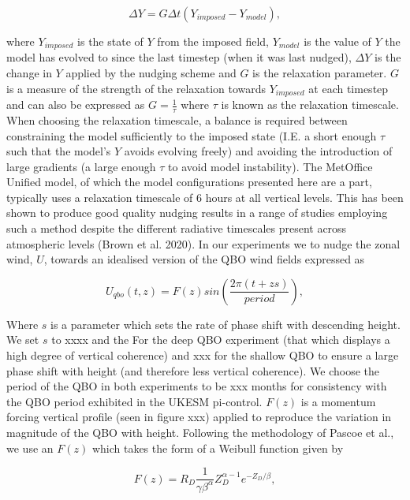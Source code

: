 \begin{equation} \label{eq:nudging}
\Delta Y = G \Delta t (Y_{imposed} - Y_{model}), 
\end{equation}

where $Y_{imposed}$ is the state of $Y$ from the imposed field, $Y_{model}$ is the value of $Y$ the model has evolved to since the last timestep (when it was last nudged), $\Delta Y$ is the change in $Y$ applied by the nudging scheme and $G$ is the relaxation parameter. $G$ is a measure of the strength of the relaxation towards $Y_{imposed}$ at each timestep and can also be expressed as $G = \frac{1}{\tau}$ where $\tau$ is known as the relaxation timescale. When choosing the relaxation timescale, a balance is required between constraining the model sufficiently to the imposed state (I.E. a short enough $\tau$ such that the model's $Y$ avoids evolving freely) and avoiding the introduction of large gradients (a large enough $\tau$ to avoid model instability). The MetOffice Unified model, of which the model configurations presented here are a part, typically uses a relaxation timescale of 6 hours at all vertical levels. This has been shown to produce good quality nudging results in a range of studies employing such a method despite the different radiative timescales present across atmospheric levels (Brown et al. 2020). In our experiments we to nudge the zonal wind, $U$, towards an idealised version of the QBO wind fields expressed as 

\begin{equation} \label{eq:imposed_U}
U_{qbo}(t, z) = F(z) sin(\frac{2\pi (t + zs)}{period}),
\end{equation}

Where $s$ is a parameter which sets the rate of phase shift with descending height. We set $s$ to xxxx and the For the deep QBO experiment (that which displays a high degree of vertical coherence) and xxx for the shallow QBO to ensure a large phase shift with height (and therefore less vertical coherence). We choose the period of the QBO in both experiments to be xxx months for consistency with the QBO period exhibited in the UKESM pi-control. $F(z)$ is a momentum forcing vertical profile (seen in figure xxx) applied to reproduce the variation in magnitude of the QBO with height. Following the methodology of Pascoe et al., we use an $F(z)$ which takes the form of a Weibull function given by

\begin{equation} \label{eq:vertical_profile}
F(z) = R_D \frac{1}{\gamma \beta^\alpha}  Z_D^{\alpha-1}  e^{-Z_D/\beta},
\end{equation}

